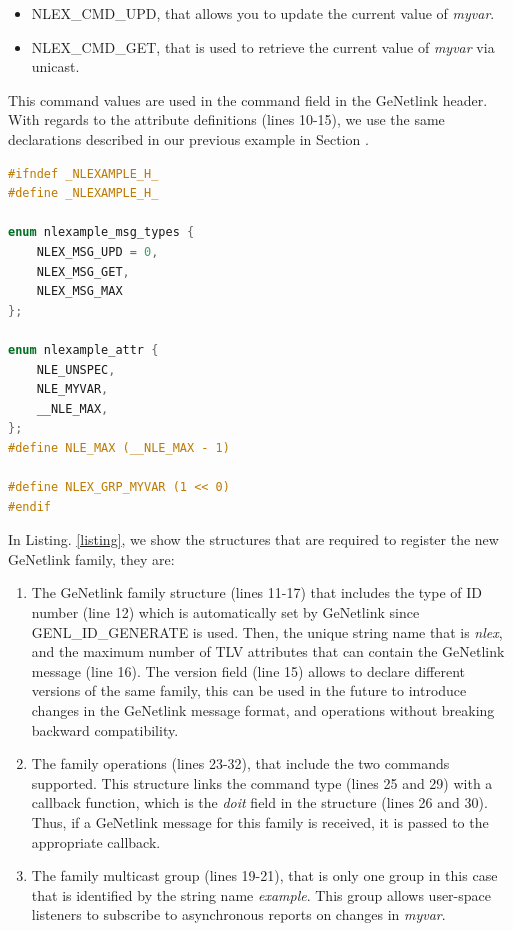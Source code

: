 \documentclass[10pt,onecolumn]{article}
\begin{document}
\begin{itemize}
  \item NLEX\_CMD\_UPD, that allows you to update the current value of \textit{myvar}.
  \item NLEX\_CMD\_GET, that is used to retrieve the current value of \textit{myvar} via unicast.
\end{itemize}

This command values are used in the command field in the GeNetlink header. With regards to the attribute definitions (lines 10-15), we use the same declarations described in our previous example in Section .

\begin{lstlisting}[language=C, caption=GeNetlink example header file, label=listing9]
#ifndef _NLEXAMPLE_H_
#define _NLEXAMPLE_H_

enum nlexample_msg_types {
    NLEX_MSG_UPD = 0,
    NLEX_MSG_GET,
    NLEX_MSG_MAX
};

enum nlexample_attr {
    NLE_UNSPEC,
    NLE_MYVAR,
    __NLE_MAX,
};
#define NLE_MAX (__NLE_MAX - 1)

#define NLEX_GRP_MYVAR (1 << 0)
#endif
\end{lstlisting}

In Listing. \ref{listing}, we show the structures that are required to register the new
GeNetlink family, they are:

\begin{enumerate}
  \item The GeNetlink family structure (lines 11-17) that includes the type of ID number (line 12) which is automatically set by GeNetlink since GENL\_ID\_GENERATE is used. Then, the unique string name that is \textit{nlex}, and the maximum number of TLV attributes that can contain the GeNetlink message (line 16). The version field (line 15) allows to declare different versions of the same family, this can be used in the future to introduce changes in the GeNetlink message format, and operations without breaking backward compatibility.
  \item The family operations (lines 23-32), that include the two commands supported. This structure links the command type (lines 25 and 29) with a callback function, which is the \textit{doit} field in the structure (lines 26 and 30). Thus, if a GeNetlink message for this family is received, it is passed to the appropriate callback.
  \item The family multicast group (lines 19-21), that is only one group in this case that is identified by the string name \textit{example}. This group allows user-space listeners to subscribe to asynchronous reports on changes in \textit{myvar}.
\end{enumerate}
\end{document}
